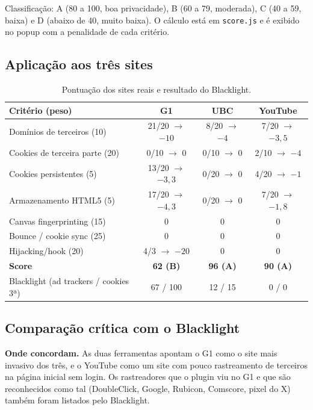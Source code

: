 \documentclass[11pt,a4paper]{article}
\begin{document}
Classificação: A (80 a 100, boa privacidade), B (60 a 79, moderada), C (40 a 59, baixa) e D (abaixo de 40, muito baixa). O cálculo está em \texttt{score.\allowbreak{}js} e é exibido no popup com a penalidade de cada critério.

\subsection{Aplicação aos três sites}

\begin{table}[H]
\centering\small
\begin{tabular}{|l|c|c|c|}
\hline
\textbf{Critério (peso)} & \textbf{G1} & \textbf{UBC} & \textbf{YouTube} \\ \hline
Domínios de terceiros (10) & 21/20 $\rightarrow$ $-10$ & 8/20 $\rightarrow$ $-4$ & 7/20 $\rightarrow$ $-3{,}5$ \\ \hline
Cookies de terceira parte (20) & 0/10 $\rightarrow$ 0 & 0/10 $\rightarrow$ 0 & 2/10 $\rightarrow$ $-4$ \\ \hline
Cookies persistentes (5) & 13/20 $\rightarrow$ $-3{,}3$ & 0/20 $\rightarrow$ 0 & 4/20 $\rightarrow$ $-1$ \\ \hline
Armazenamento HTML5 (5) & 17/20 $\rightarrow$ $-4{,}3$ & 0/20 $\rightarrow$ 0 & 7/20 $\rightarrow$ $-1{,}8$ \\ \hline
Canvas fingerprinting (15) & 0 & 0 & 0 \\ \hline
Bounce / cookie sync (25) & 0 & 0 & 0 \\ \hline
Hijacking/hook (20) & 4/3 $\rightarrow$ $-20$ & 0 & 0 \\ \hline
\textbf{Score} & \textbf{62 (B)} & \textbf{96 (A)} & \textbf{90 (A)} \\ \hline
Blacklight (ad trackers / cookies 3ª) & 67 / 100 & 12 / 15 & 0 / 0 \\ \hline
\end{tabular}
\caption{Pontuação dos sites reais e resultado do Blacklight.}
\end{table}

\subsection{Comparação crítica com o Blacklight}

\textbf{Onde concordam.} As duas ferramentas apontam o G1 como o site mais invasivo dos três, e o YouTube como um site com pouco rastreamento de terceiros na página inicial sem login. Os rastreadores que o plugin viu no G1 e que são reconhecidos como tal (DoubleClick, Google, Rubicon, Comscore, pixel do X) também foram listados pelo Blacklight.
\end{document}
